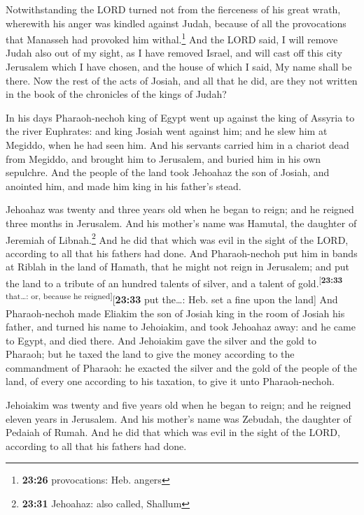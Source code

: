  Notwithstanding the LORD turned not from the fierceness
of his great wrath, wherewith his anger was kindled against Judah,
because of all the provocations that Manasseh had provoked him
withal.\footnote{\textbf{23:26} provocations: Heb. angers}
 And the LORD said, I will remove Judah also out of my
sight, as I have removed Israel, and will cast off this city Jerusalem
which I have chosen, and the house of which I said, My name shall be
there.  Now the rest of the acts of Josiah, and all that
he did, are they not written in the book of the chronicles of the kings
of Judah?

 In his days Pharaoh-nechoh king of Egypt went up against
the king of Assyria to the river Euphrates: and king Josiah went against
him; and he slew him at Megiddo, when he had seen him. 
And his servants carried him in a chariot dead from Megiddo, and brought
him to Jerusalem, and buried him in his own sepulchre. And the people of
the land took Jehoahaz the son of Josiah, and anointed him, and made him
king in his father's stead.

 Jehoahaz was twenty and three years old when he began to
reign; and he reigned three months in Jerusalem. And his mother's name
was Hamutal, the daughter of Jeremiah of Libnah.\footnote{\textbf{23:31}
  Jehoahaz: also called, Shallum}  And he did that which
was evil in the sight of the LORD, according to all that his fathers had
done.  And Pharaoh-nechoh put him in bands at Riblah in
the land of Hamath, that he might not reign in Jerusalem; and put the
land to a tribute of an hundred talents of silver, and a talent of
gold.\textsuperscript{{[}\textbf{23:33} that\ldots: or, because he
reigned{]}}{[}\textbf{23:33} put the\ldots: Heb. set a fine upon the
land{]}  And Pharaoh-nechoh made Eliakim the son of
Josiah king in the room of Josiah his father, and turned his name to
Jehoiakim, and took Jehoahaz away: and he came to Egypt, and died there.
 And Jehoiakim gave the silver and the gold to Pharaoh;
but he taxed the land to give the money according to the commandment of
Pharaoh: he exacted the silver and the gold of the people of the land,
of every one according to his taxation, to give it unto Pharaoh-nechoh.

 Jehoiakim was twenty and five years old when he began to
reign; and he reigned eleven years in Jerusalem. And his mother's name
was Zebudah, the daughter of Pedaiah of Rumah.  And he
did that which was evil in the sight of the LORD, according to all that
his fathers had done.

